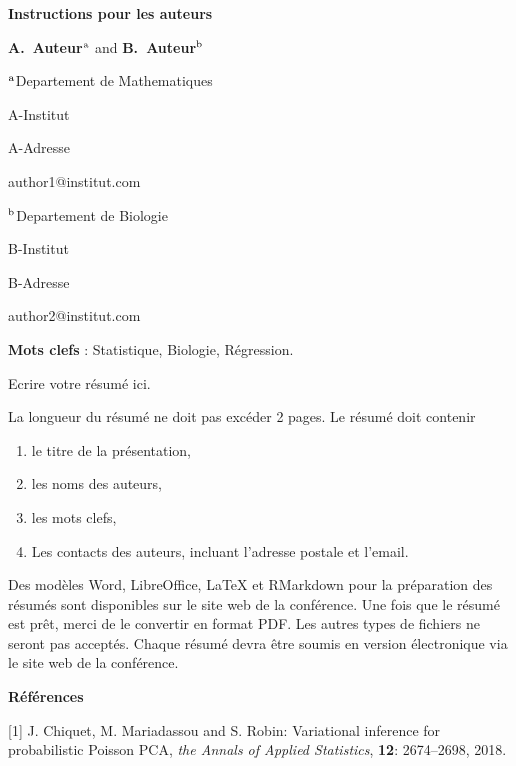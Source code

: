 \documentclass[12pt]{article}
\begin{document}
\centerline{\bf Instructions pour les auteurs}

\vspace{12pt}

\centerline{ {\bf A.~Auteur}$^{\rm a}$ and {\bf B.~Auteur}$^{\rm b}$}

\vspace{12pt}

\centerline{$^{\rm a}$Departement de Mathematiques}
\centerline{A-Institut}
\centerline{A-Adresse}
\centerline{author1@institut.com}

\vspace{12pt}

\centerline{$^{\rm b}$Departement de Biologie}
\centerline{B-Institut}
\centerline{B-Adresse}
\centerline{author2@institut.com}

\vspace{24pt}

{\bf Mots clefs} : Statistique, Biologie, R\'egression.

\vspace{24pt}

Ecrire votre r\'esum\'e ici.

La longueur du r\'esum\'e ne doit pas exc\'eder 2 pages. Le r\'esum\'e doit contenir
\begin{enumerate}
\item  le titre de la pr\'esentation,
\item  les noms des auteurs,
\item  les mots clefs,
\item  Les contacts des auteurs, incluant l'adresse postale et l'email.
\end{enumerate}

Des mod\`eles Word, LibreOffice, LaTeX et RMarkdown pour la pr\'eparation des 
r\'esum\'es sont disponibles sur le site web de la conf\'erence. Une fois que 
le r\'esum\'e est pr\^et, merci de le convertir en format PDF. Les autres types 
de fichiers ne seront pas accept\'es. Chaque r\'esum\'e devra \^etre soumis en 
version \'electronique via le site web de la conf\'erence.


\vspace{12pt}

\parindent=0pt
{\bf R\'ef\'erences}

[1] J. Chiquet, M. Mariadassou and S. Robin: Variational inference for probabilistic Poisson PCA, {\it the Annals of Applied Statistics}, {\bf 12}: 2674--2698, 2018.
\end{document}
